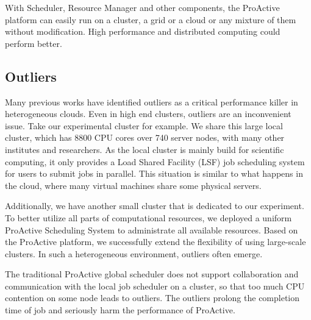 With Scheduler, Resource Manager and other components, the ProActive platform can
 easily run on a cluster, a grid or a cloud or any mixture of them without
modification. High performance and distributed computing could perform better. 

\subsection{Outliers}

Many previous works have identified outliers as a critical performance killer in
heterogeneous clouds. Even in high end clusters, outliers are an inconvenient issue. Take our
experimental cluster for example. We share this large local cluster, which has 8800 CPU
cores over 740 server nodes, with many other institutes and researchers. As the local
cluster is mainly build for scientific computing, it only provides a Load Shared Facility
(LSF) job scheduling system for users to submit jobs in parallel. This situation is
similar to what happens in the cloud, where many virtual machines share some physical
servers.

Additionally, we have another small cluster that is dedicated to our experiment. To
better utilize all parts of computational resources, we deployed a uniform ProActive
Scheduling System to administrate all available resources. Based on the ProActive
platform, we successfully extend the flexibility of using large-scale clusters. In such a
heterogeneous environment, outliers often emerge.

The traditional ProActive global scheduler does not support collaboration and
communication with the local job scheduler on a cluster, so that too much CPU contention
on some node leads to outliers. The outliers prolong the completion time of job and seriously harm
the performance of ProActive.
